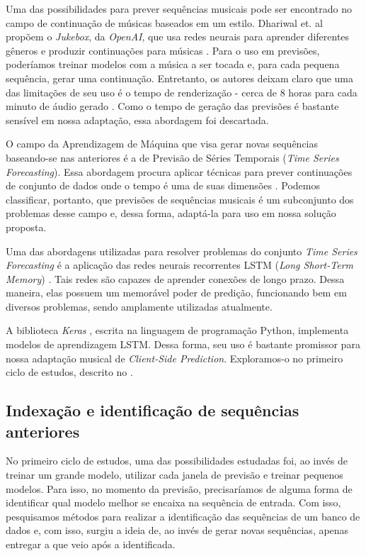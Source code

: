 Uma das possibilidades para prever sequências musicais pode ser encontrado no campo de continuação de músicas baseados em um estilo. Dhariwal et. al propõem o \textit{Jukebox}, da \textit{OpenAI}, que usa redes neurais para aprender diferentes gêneros e produzir continuações para músicas \cite{jukebox}. Para o uso em previsões, poderíamos treinar modelos com a música a ser tocada e, para cada pequena sequência, gerar uma continuação. Entretanto, os autores deixam claro que uma das limitações de seu uso é o tempo de renderização - cerca de 8 horas para cada minuto de áudio gerado \cite{jukebox}. Como o tempo de geração das previsões é bastante sensível em nossa adaptação, essa abordagem foi descartada.

O campo da Aprendizagem de Máquina que visa gerar novas sequências baseando-se nas anteriores é a de Previsão de Séries Temporais (\textit{Time Series Forecasting}). Essa abordagem procura aplicar técnicas para prever continuações de conjunto de dados onde o tempo é uma de suas dimensões \cite{time_series_forecasting}. Podemos classificar, portanto, que previsões de sequências musicais é um subconjunto dos problemas desse campo e, dessa forma, adaptá-la para uso em nossa solução proposta.

Uma das abordagens utilizadas para resolver problemas do conjunto \textit{Time Series Forecasting} é a aplicação das redes neurais recorrentes LSTM (\textit{Long Short-Term Memory}) \cite{lstm}. Tais redes são capazes de aprender conexões de longo prazo. Dessa maneira, elas possuem um memorável poder de predição, funcionando bem em diversos problemas, sendo amplamente utilizadas atualmente.

A biblioteca \textit{Keras} \cite{keras}, escrita na linguagem de programação Python, implementa modelos de aprendizagem LSTM. Dessa forma, seu uso é bastante promissor para nossa adaptação musical de \textit{Client-Side Prediction}. Exploramos-o no primeiro ciclo de estudos, descrito no .

\subsection{Indexação e identificação de sequências anteriores}
\label{subsec:indexation_and_identification}

No primeiro ciclo de estudos, uma das possibilidades estudadas foi, ao invés de treinar um grande modelo, utilizar cada janela de previsão e treinar pequenos modelos. Para isso, no momento da previsão, precisaríamos de alguma forma de identificar qual modelo melhor se encaixa na sequência de entrada. Com isso, pesquisamos métodos para realizar a identificação das sequências de um banco de dados e, com isso, surgiu a ideia de, ao invés de gerar novas sequências, apenas entregar a que veio após a identificada. 

